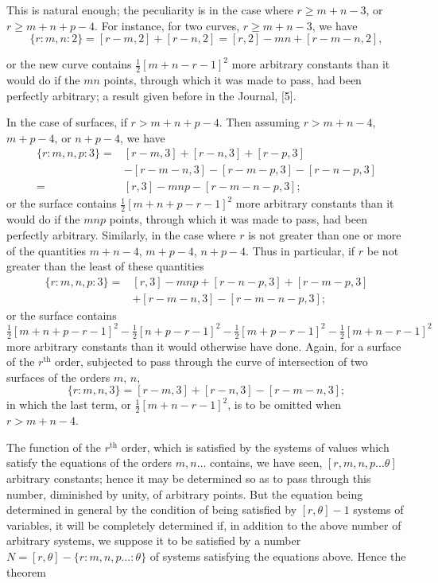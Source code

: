 \documentclass[11pt]{article}
\begin{document}
This is natural enough; the peculiarity is in the case where $r \geq m + n - 3$, or $r \geq m + n + p - 4$. For instance, for two curves, $r \geq m + n - 3$, we have
\[
\{r : m, n : 2\} = [r - m, 2] + [r - n, 2] = [r, 2] - mn + [r - m - n, 2],
\]

\newpage
\setcounter{page}{262}

or the new curve contains $\tfrac12 [m + n - r - 1]^2$ more arbitrary constants than it would do if the $mn$ points, through which it was made to pass, had been perfectly arbitrary; a result given before in the Journal, [5].

In the case of surfaces, if $r > m + n + p - 4$. Then assuming $r > m + n - 4$, $m + p - 4$, or $n + p - 4$, we have
\begin{align*}
\{r : m, n, p : 3\} = {}& [r - m, 3] + [r - n, 3] + [r - p, 3]\\
& - [r - m - n, 3] - [r - m - p, 3] - [r - n - p, 3]\\
= {}& [r, 3] - mnp - [r - m - n - p, 3];
\end{align*}
or the surface contains $\tfrac12 [m + n + p - r - 1]^2$ more arbitrary constants than it would do if the $mnp$ points, through which it was made to pass, had been perfectly arbitrary. Similarly, in the case where $r$ is not greater than one or more of the quantities $m + n - 4$, $m + p - 4$, $n + p - 4$. Thus in particular, if $r$ be not greater than the least of these quantities
\begin{align*}
\{r : m, n, p : 3\} = {}& [r, 3] - mnp + [r - n - p, 3] + [r - m - p, 3]\\
& + [r - m - n, 3] - [r - m - n - p, 3];
\end{align*}
or the surface contains
\[
\tfrac12 [m + n + p - r - 1]^2 - \tfrac12 [n + p - r - 1]^2 - \tfrac12 [m + p - r - 1]^2 - \tfrac12 [m + n - r - 1]^2
\]
more arbitrary constants than it would otherwise have done. Again, for a surface of the $r^{\mathrm{th}}$ order, subjected to pass through the curve of intersection of two surfaces of the orders $m$, $n$,
\[
\{r : m, n, 3\} = [r - m, 3] + [r - n, 3] - [r - m - n, 3];
\]
in which the last term, or $\tfrac12 [m + n - r - 1]^2$, is to be omitted when $r > m + n - 4$.

The function of the $r^{\mathrm{th}}$ order, which is satisfied by the systems of values which satisfy the equations of the orders $m, n \ldots$ contains, we have seen, $[r, m, n, p \ldots \theta]$ arbitrary constants; hence it may be determined so as to pass through this number, diminished by unity, of arbitrary points. But the equation being determined in general by the condition of being satisfied by $[r, \theta] - 1$ systems of variables, it will be completely determined if, in addition to the above number of arbitrary systems, we suppose it to be satisfied by a number $N = [r, \theta] - \{r : m, n, p \ldots : \theta\}$ of systems satisfying the equations above. Hence the theorem
\end{document}
